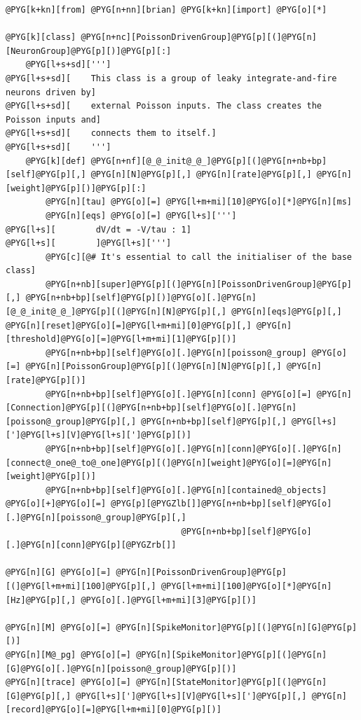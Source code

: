 \documentclass[letterpaper,10pt,english]{manual}
\begin{document}
\begin{Verbatim}[commandchars=@\[\]]
@PYG[k+kn][from] @PYG[n+nn][brian] @PYG[k+kn][import] @PYG[o][*]

@PYG[k][class] @PYG[n+nc][PoissonDrivenGroup]@PYG[p][(]@PYG[n][NeuronGroup]@PYG[p][)]@PYG[p][:]
    @PYG[l+s+sd][''']
@PYG[l+s+sd][    This class is a group of leaky integrate-and-fire neurons driven by]
@PYG[l+s+sd][    external Poisson inputs. The class creates the Poisson inputs and]
@PYG[l+s+sd][    connects them to itself.]
@PYG[l+s+sd][    ''']
    @PYG[k][def] @PYG[n+nf][@_@_init@_@_]@PYG[p][(]@PYG[n+nb+bp][self]@PYG[p][,] @PYG[n][N]@PYG[p][,] @PYG[n][rate]@PYG[p][,] @PYG[n][weight]@PYG[p][)]@PYG[p][:]
        @PYG[n][tau] @PYG[o][=] @PYG[l+m+mi][10]@PYG[o][*]@PYG[n][ms]
        @PYG[n][eqs] @PYG[o][=] @PYG[l+s][''']
@PYG[l+s][        dV/dt = -V/tau : 1]
@PYG[l+s][        ]@PYG[l+s][''']
        @PYG[c][@# It's essential to call the initialiser of the base class]
        @PYG[n+nb][super]@PYG[p][(]@PYG[n][PoissonDrivenGroup]@PYG[p][,] @PYG[n+nb+bp][self]@PYG[p][)]@PYG[o][.]@PYG[n][@_@_init@_@_]@PYG[p][(]@PYG[n][N]@PYG[p][,] @PYG[n][eqs]@PYG[p][,] @PYG[n][reset]@PYG[o][=]@PYG[l+m+mi][0]@PYG[p][,] @PYG[n][threshold]@PYG[o][=]@PYG[l+m+mi][1]@PYG[p][)]
        @PYG[n+nb+bp][self]@PYG[o][.]@PYG[n][poisson@_group] @PYG[o][=] @PYG[n][PoissonGroup]@PYG[p][(]@PYG[n][N]@PYG[p][,] @PYG[n][rate]@PYG[p][)]
        @PYG[n+nb+bp][self]@PYG[o][.]@PYG[n][conn] @PYG[o][=] @PYG[n][Connection]@PYG[p][(]@PYG[n+nb+bp][self]@PYG[o][.]@PYG[n][poisson@_group]@PYG[p][,] @PYG[n+nb+bp][self]@PYG[p][,] @PYG[l+s][']@PYG[l+s][V]@PYG[l+s][']@PYG[p][)]
        @PYG[n+nb+bp][self]@PYG[o][.]@PYG[n][conn]@PYG[o][.]@PYG[n][connect@_one@_to@_one]@PYG[p][(]@PYG[n][weight]@PYG[o][=]@PYG[n][weight]@PYG[p][)]
        @PYG[n+nb+bp][self]@PYG[o][.]@PYG[n][contained@_objects] @PYG[o][+]@PYG[o][=] @PYG[p][@PYGZlb[]]@PYG[n+nb+bp][self]@PYG[o][.]@PYG[n][poisson@_group]@PYG[p][,]
                                   @PYG[n+nb+bp][self]@PYG[o][.]@PYG[n][conn]@PYG[p][@PYGZrb[]]

@PYG[n][G] @PYG[o][=] @PYG[n][PoissonDrivenGroup]@PYG[p][(]@PYG[l+m+mi][100]@PYG[p][,] @PYG[l+m+mi][100]@PYG[o][*]@PYG[n][Hz]@PYG[p][,] @PYG[o][.]@PYG[l+m+mi][3]@PYG[p][)]

@PYG[n][M] @PYG[o][=] @PYG[n][SpikeMonitor]@PYG[p][(]@PYG[n][G]@PYG[p][)]
@PYG[n][M@_pg] @PYG[o][=] @PYG[n][SpikeMonitor]@PYG[p][(]@PYG[n][G]@PYG[o][.]@PYG[n][poisson@_group]@PYG[p][)]
@PYG[n][trace] @PYG[o][=] @PYG[n][StateMonitor]@PYG[p][(]@PYG[n][G]@PYG[p][,] @PYG[l+s][']@PYG[l+s][V]@PYG[l+s][']@PYG[p][,] @PYG[n][record]@PYG[o][=]@PYG[l+m+mi][0]@PYG[p][)]


\end{Verbatim}
\end{document}
